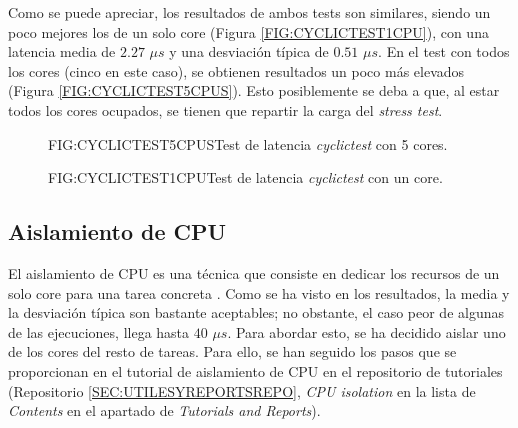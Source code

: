 Como se puede apreciar, los resultados de ambos tests son similares, siendo un poco mejores los de un solo core (Figura \ref{FIG:CYCLICTEST1CPU}), con una latencia media de $2.27$ $\mu s$ y una desviación típica de $0.51$ $\mu s$. En el test con todos los cores (cinco en este caso), se obtienen resultados un poco más elevados (Figura \ref{FIG:CYCLICTEST5CPUS}). Esto posiblemente se deba a que, al estar todos los cores ocupados, se tienen que repartir la carga del \textit{stress test}.

\begin{figure}[Ejecución de cylictest con 5 cores]{FIG:CYCLICTEST5CPUS}{Test de latencia \textit{cyclictest} con 5 cores.}
\end{figure}

\begin{figure}[Ejecución de cylictest con un core]{FIG:CYCLICTEST1CPU}{Test de latencia \textit{cyclictest} con un core.}
\end{figure}





\subsection{Aislamiento de CPU\label{SS:AISLAMIENTOCPU}}


El aislamiento de CPU es una técnica que consiste en dedicar los recursos de un solo core para una tarea concreta \cite{Amaducci2022}. Como se ha visto en los resultados, la media y la desviación típica son bastante aceptables; no obstante, el caso peor de algunas de las ejecuciones, llega hasta $40$ $\mu s$. Para abordar esto, se ha decidido aislar uno de los cores del resto de tareas. Para ello, se han seguido los pasos que se proporcionan en el tutorial de aislamiento de CPU en el repositorio de tutoriales (Repositorio \ref{SEC:UTILESYREPORTSREPO}, \textit{CPU isolation} en la lista de \textit{Contents} en el apartado de \textit{Tutorials and Reports}).

